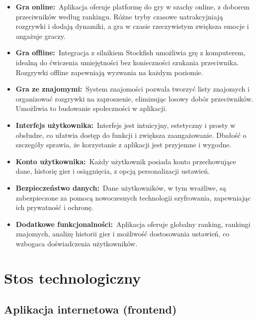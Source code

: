\documentclass[twoside]{projektInzynierskiMS1}
\begin{document}
\begin{itemize}
    \item \textbf{Gra online:}\
    Aplikacja oferuje platformę do gry w szachy online, z doborem przeciwników według rankingu. Różne tryby czasowe uatrakcyjniają rozgrywki i dodają dynamiki, a gra w czasie rzeczywistym zwiększa emocje i angażuje graczy.
    
    \item \textbf{Gra offline:}\
    Integracja z silnikiem Stockfish umożliwia grę z komputerem, idealną do ćwiczenia umiejętności bez konieczności szukania przeciwnika. Rozgrywki offline zapewniają wyzwania na każdym poziomie.
    
    \item \textbf{Gra ze znajomymi:}\
    System znajomości pozwala tworzyć listy znajomych i organizować rozgrywki na zaproszenie, eliminując losowy dobór przeciwników. Umożliwia to budowanie społeczności w aplikacji.
    
    \item \textbf{Interfejs użytkownika:}\
    Interfejs jest intuicyjny, estetyczny i prosty w obsłudze, co ułatwia dostęp do funkcji i zwiększa zaangażowanie. Dbałość o szczegóły sprawia, że korzystanie z aplikacji jest przyjemne i wygodne.
    
    \item \textbf{Konto użytkownika:}\
    Każdy użytkownik posiada konto przechowujące dane, historię gier i osiągnięcia, z opcją personalizacji ustawień.
    
    \item \textbf{Bezpieczeństwo danych:}\
    Dane użytkowników, w tym wrażliwe, są zabezpieczone za pomocą nowoczesnych technologii szyfrowania, zapewniając ich prywatność i ochronę.
    
    \item \textbf{Dodatkowe funkcjonalności:}\
    Aplikacja oferuje globalny ranking, rankingi znajomych, analizę historii gier i możliwość dostosowania ustawień, co wzbogaca doświadczenia użytkowników.
    \end{itemize}

\newpage

\section{Stos technologiczny}

\subsection{Aplikacja internetowa (frontend)}
\end{document}
